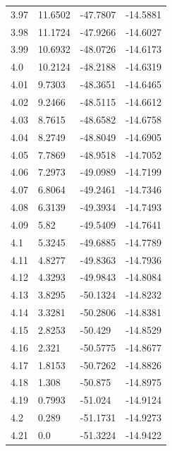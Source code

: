 \begin{tabular}{llll}
3.97 & 11.6502 & -47.7807 & -14.5881 \\
3.98 & 11.1724 & -47.9266 & -14.6027 \\
3.99 & 10.6932 & -48.0726 & -14.6173 \\
4.0 & 10.2124 & -48.2188 & -14.6319 \\
4.01 & 9.7303 & -48.3651 & -14.6465 \\
4.02 & 9.2466 & -48.5115 & -14.6612 \\
4.03 & 8.7615 & -48.6582 & -14.6758 \\
4.04 & 8.2749 & -48.8049 & -14.6905 \\
4.05 & 7.7869 & -48.9518 & -14.7052 \\
4.06 & 7.2973 & -49.0989 & -14.7199 \\
4.07 & 6.8064 & -49.2461 & -14.7346 \\
4.08 & 6.3139 & -49.3934 & -14.7493 \\
4.09 & 5.82 & -49.5409 & -14.7641 \\
4.1 & 5.3245 & -49.6885 & -14.7789 \\
4.11 & 4.8277 & -49.8363 & -14.7936 \\
4.12 & 4.3293 & -49.9843 & -14.8084 \\
4.13 & 3.8295 & -50.1324 & -14.8232 \\
4.14 & 3.3281 & -50.2806 & -14.8381 \\
4.15 & 2.8253 & -50.429 & -14.8529 \\
4.16 & 2.321 & -50.5775 & -14.8677 \\
4.17 & 1.8153 & -50.7262 & -14.8826 \\
4.18 & 1.308 & -50.875 & -14.8975 \\
4.19 & 0.7993 & -51.024 & -14.9124 \\
4.2 & 0.289 & -51.1731 & -14.9273 \\
4.21 & 0.0 & -51.3224 & -14.9422 \\
\bottomrule
\end{tabular}
